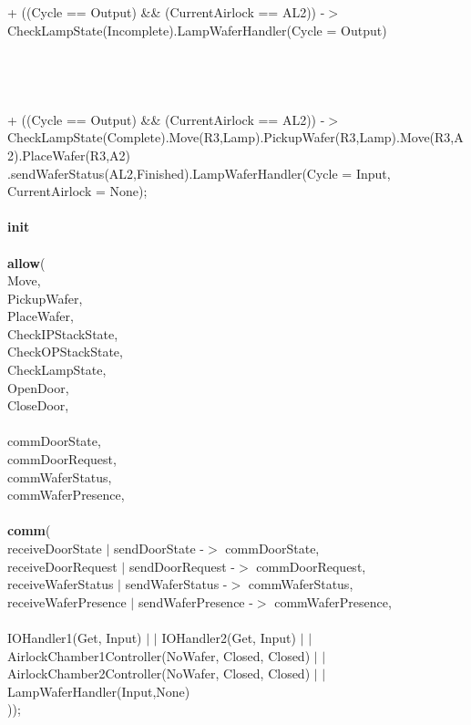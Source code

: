 \documentclass[a4paper,12pt]{article}
\begin{document}
	\\
	\\+ ((Cycle == Output) \&\& (CurrentAirlock == AL2)) -$>$ CheckLampState(Incomplete).LampWaferHandler(Cycle = Output)
	\\
	\\
	\\
	\\
	\\+ ((Cycle == Output) \&\& (CurrentAirlock == AL2)) -$>$ CheckLampState(Complete).Move(R3,Lamp).PickupWafer(R3,Lamp).Move(R3,A2).PlaceWafer(R3,A2)
	\\.sendWaferStatus(AL2,Finished).LampWaferHandler(Cycle = Input, CurrentAirlock = None);
	\\
	\\\textbf{init} 
	\\
	\\\textbf{			allow}(
	\\						{Move,
		\\ 				 	 PickupWafer,
		\\				 		 PlaceWafer,
		\\	    			 CheckIPStackState,
		\\	  				 CheckOPStackState,
		\\						 CheckLampState,
		\\						 OpenDoor,
		\\						 CloseDoor,
		\\
		\\						 commDoorState,
		\\						 commDoorRequest,
		\\						 commWaferStatus,
		\\						 commWaferPresence},
	\\
	\\\textbf{			comm}(
	\\						{receiveDoorState $|$ sendDoorState -$>$ commDoorState,
		\\						receiveDoorRequest $|$ sendDoorRequest -$>$ commDoorRequest,
		\\	  				 	receiveWaferStatus $|$ sendWaferStatus -$>$ commWaferStatus,
		\\				 	   receiveWaferPresence $|$ sendWaferPresence -$>$ commWaferPresence},
	\\
	\\						 IOHandler1(Get, Input) $|$ $|$ IOHandler2(Get, Input) $|$ $|$ AirlockChamber1Controller(NoWafer, Closed, Closed) $|$ $|$ AirlockChamber2Controller(NoWafer, Closed, Closed) $|$ $|$ LampWaferHandler(Input,None)
	\\					 ));
	\newpage
\end{document}
